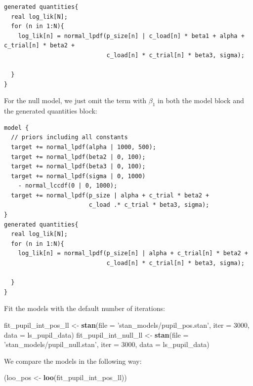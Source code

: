 \documentclass[12pt,]{krantz}
\newenvironment{Shaded}{\begin{snugshade}}{\end{snugshade}}
\newcommand{\DataTypeTok}[1]{\textcolor[rgb]{0.13,0.29,0.53}{#1}}
\newcommand{\DecValTok}[1]{\textcolor[rgb]{0.00,0.00,0.81}{#1}}
\newcommand{\KeywordTok}[1]{\textcolor[rgb]{0.13,0.29,0.53}{\textbf{#1}}}
\newcommand{\NormalTok}[1]{#1}
\newcommand{\StringTok}[1]{\textcolor[rgb]{0.31,0.60,0.02}{#1}}
\theoremstyle{definition}
\theoremstyle{definition}
\theoremstyle{definition}
\theoremstyle{remark}
\begin{document}
\begin{verbatim}
generated quantities{
  real log_lik[N];
  for (n in 1:N){
    log_lik[n] = normal_lpdf(p_size[n] | c_load[n] * beta1 + alpha + c_trial[n] * beta2 +
                             c_load[n] * c_trial[n] * beta3, sigma);

  }
}
\end{verbatim}

For the null model, we just omit the term with \(\beta_1\) in both the model block and the generated quantities block:

\begin{verbatim}
model {
  // priors including all constants
  target += normal_lpdf(alpha | 1000, 500);
  target += normal_lpdf(beta2 | 0, 100);
  target += normal_lpdf(beta3 | 0, 100);
  target += normal_lpdf(sigma | 0, 1000)
    - normal_lccdf(0 | 0, 1000);
  target += normal_lpdf(p_size | alpha + c_trial * beta2 +
                        c_load .* c_trial * beta3, sigma);
}
generated quantities{
  real log_lik[N];
  for (n in 1:N){
    log_lik[n] = normal_lpdf(p_size[n] | alpha + c_trial[n] * beta2 +
                             c_load[n] * c_trial[n] * beta3, sigma);

  }
}
\end{verbatim}

Fit the models with the default number of iterations:

\begin{Shaded}
\begin{Highlighting}[]
\NormalTok{fit_pupil_int_pos_ll <-}\StringTok{ }\KeywordTok{stan}\NormalTok{(}\DataTypeTok{file =} \StringTok{'stan_models/pupil_pos.stan'}\NormalTok{,}
                             \DataTypeTok{iter =} \DecValTok{3000}\NormalTok{,}
                             \DataTypeTok{data =}\NormalTok{ ls_pupil_data)}
\NormalTok{fit_pupil_int_null_ll <-}\StringTok{ }\KeywordTok{stan}\NormalTok{(}\DataTypeTok{file =} \StringTok{'stan_models/pupil_null.stan'}\NormalTok{,}
                              \DataTypeTok{iter =} \DecValTok{3000}\NormalTok{,}
                              \DataTypeTok{data =}\NormalTok{ ls_pupil_data)}
\end{Highlighting}
\end{Shaded}

We compare the models in the following way:

\begin{Shaded}
\begin{Highlighting}[]
\NormalTok{(loo_pos <-}\StringTok{ }\KeywordTok{loo}\NormalTok{(fit_pupil_int_pos_ll))}
\end{Highlighting}
\end{Shaded}
\end{document}
